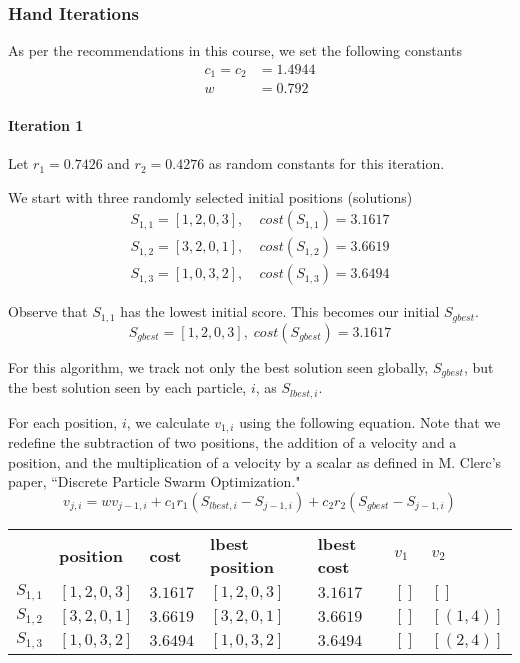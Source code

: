 \documentclass[a4paper]{article}
\newcommand{\subsubsubsection}[1]{\paragraph{#1} \mbox{}}
\begin{document}
\subsubsection{Hand Iterations}

As per the recommendations in this course, we set the following constants
\begin{align*}
c_1 = c_2 & = 1.4944 \\
w & = 0.792
\end{align*}

\subsubsubsection{Iteration 1}

Let $r_1 = 0.7426$ and $r_2 = 0.4276$ as random constants for this iteration.

We start with three randomly selected initial positions (solutions)
\begin{align*}
S_{1,1} = [1, 2, 0, 3], & \; cost(S_{1,1}) = 3.1617 \\
S_{1,2} = [3, 2, 0, 1], & \; cost(S_{1,2}) = 3.6619 \\
S_{1,3} = [1, 0, 3, 2], & \; cost(S_{1,3}) = 3.6494
\end{align*}

Observe that $S_{1,1}$ has the lowest initial score. This becomes our initial $S_\mathit{gbest}$.
$$S_\mathit{gbest} = [1, 2, 0, 3], \; cost(S_\mathit{gbest}) = 3.1617$$

For this algorithm, we track not only the best solution seen globally,
$S_\mathit{gbest}$, but the best solution seen by each particle, $i$, as
$S_{\mathit{lbest}, i}$.

For each position, $i$, we calculate
$v_{1,i}$ using the following equation. Note that we redefine the subtraction of
two positions, the addition of a velocity and a position, and the multiplication
of a velocity by a scalar as defined in M. Clerc's paper, ``Discrete Particle
Swarm Optimization."
$$
v_{j,i} =
  w v_{j-1, i} +
  c_1 r_1 (S_{\mathit{lbest}, i} - S_{j-1, i}) +
  c_2 r_2 (S_\mathit{gbest} - S_{j-1, i})
$$

\begin{center}
\begin{tabular}{lllllll}
          & \textbf{position} & \textbf{cost} & \textbf{lbest position} & \textbf{lbest cost} & $v_1$ & $v_2$            \\
$S_{1,1}$ & $[1, 2, 0, 3]$    & $3.1617$      & $[1, 2, 0, 3]$          & $3.1617$            & $[]$  & $[]      $ \\
$S_{1,2}$ & $[3, 2, 0, 1]$    & $3.6619$      & $[3, 2, 0, 1]$          & $3.6619$            & $[]$  & $[(1, 4)]$ \\
$S_{1,3}$ & $[1, 0, 3, 2]$    & $3.6494$      & $[1, 0, 3, 2]$          & $3.6494$            & $[]$  & $[(2, 4)]$ \\
\end{tabular}
\end{center}
\vspace{1.5em}
\end{document}
